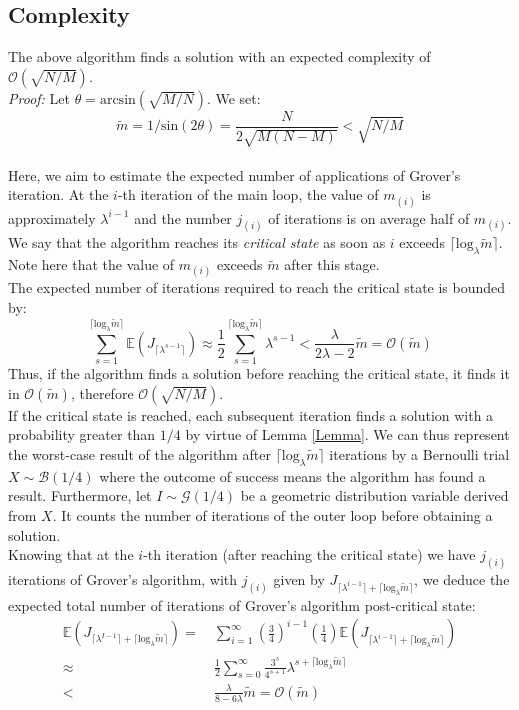\subsection{Complexity}
The above algorithm finds a solution with an expected complexity of $\mathcal{O}(\sqrt{N/M})$.
\\
\textit{Proof:} Let $\theta = \mathrm{arcsin}(\sqrt{M/N})$. We set: \[\tilde{m} = 1/\mathrm{sin}(2\theta) = \frac{N}{2\sqrt{M(N-M)}} < \sqrt{N/M}\]
\\
Here, we aim to estimate the expected number of applications of Grover's iteration. At the $i$-th iteration of the main loop, the value of $m_{(i)}$ is approximately $\lambda^{i-1}$ and the number $j_{(i)}$ of iterations is on average half of $m_{(i)}$.
We say that the algorithm reaches its \textit{critical state} as soon as $i$ exceeds $\lceil \mathrm{log}_{\lambda}\tilde{m} \rceil$. Note here that the value of $m_{(i)}$ exceeds $\tilde{m}$ after this stage.
\\
The expected number of iterations required to reach the critical state is bounded by:
\[\sum_{s=1}^{\lceil \mathrm{log}_{\lambda}\tilde{m} \rceil} \mathbb{E}(J_{\lceil \lambda^{s-1}\rceil}) \approx \frac{1}{2} \sum_{s=1}^{\lceil \mathrm{log}_{\lambda}\tilde{m} \rceil} \lambda^{s-1} < \frac{\lambda}{2\lambda-2}\tilde{m} = \mathcal{O}(\tilde{m})\]
Thus, if the algorithm finds a solution before reaching the critical state, it finds it in $\mathcal{O}(\tilde{m})$, therefore $\mathcal{O}(\sqrt{N/M})$.
\\
If the critical state is reached, each subsequent iteration finds a solution with a probability greater than $1/4$ by virtue of Lemma \ref{Lemma}.
We can thus represent the worst-case result of the algorithm after $\lceil \mathrm{log}_{\lambda}\tilde{m} \rceil$ iterations by a Bernoulli trial $X \sim \mathcal{B}(1/4)$ where the outcome of success means the algorithm has found a result.
Furthermore, let $I \sim \mathcal{G}(1/4)$ be a geometric distribution variable derived from $X$. It counts the number of iterations of the outer loop before obtaining a solution.
\\
Knowing that at the $i$-th iteration (after reaching the critical state) we have $j_{(i)}$ iterations of Grover's algorithm, with $j_{(i)}$ given by $J_{\lceil \lambda^{i-1}\rceil + \lceil \mathrm{log}_{\lambda}\tilde{m} \rceil}$, we deduce the expected total number of iterations of Grover's algorithm post-critical state:
\begin{align*}
\mathbb{E}(J_{\lceil \lambda^{I-1}\rceil + \lceil \mathrm{log}_{\lambda}\tilde{m} \rceil})
=&\ \sum_{i=1}^{\infty} \left( \frac{3}{4} \right) ^{i-1} \! \left( \frac{1}{4} \right) \mathbb{E}(J_{\lceil \lambda^{i-1}\rceil + \lceil \mathrm{log}_{\lambda}\tilde{m} \rceil}) \\
\approx&\ \frac{1}{2} \sum_{s=0}^{\infty} \frac{3^s}{4^{s+1}}\lambda^{s+\lceil \mathrm{log}_{\lambda}\tilde{m} \rceil} \\
<&\ \frac{\lambda}{8-6\lambda}\tilde{m} = \mathcal{O}(\tilde{m})
\end{align*}
